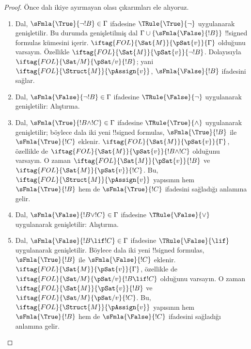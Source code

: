 \begin{proof}
Önce dalı ikiye ayırmayan olası çıkarımları ele alıyoruz.
\begin{enumerate}
\item Dal, $\sFmla{\True}{\lnot !B} \in \Gamma$ ifadesine
  $\TRule{\True}{\lnot}$ uygulanarak genişletilir. Bu durumda genişletilmiş
  dal $\Gamma \cup \{\sFmla{\False}{!B}\}$ !!{signed formula}s kümesini
  içerir. $\iftag{FOL}{\Sat{M}}{\pSat{v}}{\Gamma}$ olduğunu varsayın.
  Özellikle $\iftag{FOL}{\Sat{M}}{\pSat{v}}{\lnot !B}$. Dolayısıyla
  $\iftag{FOL}{\Sat/{M}}{\pSat/{v}}{!B}$; yani
  $\iftag{FOL}{\Struct{M}}{\pAssign{v}}$, $\sFmla{\False}{!B}$ ifadesini
  sağlar.
\item Dal, $\sFmla{\False}{\lnot !B} \in \Gamma$ ifadesine
  $\TRule{\False}{\lnot}$ uygulanarak genişletilir: Alıştırma.
\item Dal, $\sFmla{\True}{!B \land !C} \in \Gamma$ ifadesine
  $\TRule{\True}{\land}$ uygulanarak genişletilir; böylece dala iki yeni
  !!{signed formula}s, $\sFmla{\True}{!B}$ ile $\sFmla{\True}{!C}$ eklenir.
  $\iftag{FOL}{\Sat{M}}{\pSat{v}}{\Gamma}$, özellikle de
  $\iftag{FOL}{\Sat{M}}{\pSat{v}}{!B \land !C}$ olduğunu varsayın. O zaman
  $\iftag{FOL}{\Sat{M}}{\pSat{v}}{!B}$ ve
  $\iftag{FOL}{\Sat{M}}{\pSat{v}}{!C}$. Bu,
  $\iftag{FOL}{\Struct{M}}{\pAssign{v}}$ yapısının hem
  $\sFmla{\True}{!B}$ hem de $\sFmla{\True}{!C}$ ifadesini sağladığı
  anlamına gelir.
\item Dal, $\sFmla{\False}{!B \lor !C} \in \Gamma$ ifadesine
  $\TRule{\False}{\lor}$ uygulanarak genişletilir: Alıştırma.
\item Dal, $\sFmla{\False}{!B \lif !C} \in \Gamma$ ifadesine
  $\TRule{\False}{\lif}$ uygulanarak genişletilir. Böylece dala iki yeni
  !!{signed formula}s, $\sFmla{\True}{!B}$ ile $\sFmla{\False}{!C}$ eklenir.
  $\iftag{FOL}{\Sat{M}}{\pSat{v}}{\Gamma}$, özellikle de
  $\iftag{FOL}{\Sat/{M}}{\pSat/{v}}{!B \lif !C}$ olduğunu varsayın. O zaman
  $\iftag{FOL}{\Sat{M}}{\pSat{v}}{!B}$ ve
  $\iftag{FOL}{\Sat/{M}}{\pSat/{v}}{!C}$. Bu,
  $\iftag{FOL}{\Struct{M}}{\pAssign{v}}$ yapısının hem
  $\sFmla{\True}{!B}$ hem de $\sFmla{\False}{!C}$ ifadesini sağladığı
  anlamına gelir.

\end{enumerate}
\end{proof}
